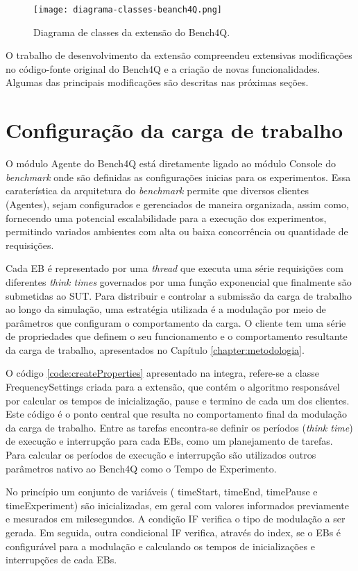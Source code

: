 \begin{figure}[!htb]
	\centering
	\texttt{[image: diagrama-classes-beanch4Q.png]}	
	\caption{Diagrama de classes da extensão do Bench4Q.}
	\label{fig:diagrama-classes}
	\fautor
\end{figure}

O trabalho de desenvolvimento da extensão compreendeu extensivas modificações no código-fonte original do Bench4Q e a criação de novas funcionalidades. Algumas das principais modificações são descritas nas próximas seções.

\section{Configuração da carga de trabalho}
O módulo Agente do Bench4Q está diretamente ligado ao módulo Console do \textit{benchmark} onde são definidas as configurações inicias para os experimentos. Essa caraterística da arquitetura do \textit{benchmark} permite que diversos clientes (Agentes), sejam configurados e gerenciados de maneira organizada, assim como, fornecendo uma potencial escalabilidade para a execução dos experimentos, permitindo variados ambientes com alta ou baixa concorrência ou quantidade de requisições.

Cada EB é representado por uma \textit{thread} que executa uma série requisições com diferentes \textit{think times} governados por uma função exponencial que finalmente são submetidas ao SUT. Para distribuir e controlar a submissão da carga de trabalho ao longo da simulação, uma estratégia utilizada é a modulação por meio de parâmetros que configuram o comportamento da carga. O cliente tem uma série de propriedades que definem o seu funcionamento e o comportamento resultante da carga de trabalho, apresentados no Capítulo \ref{chapter:metodologia}. 

O código \ref{code:createProperties} apresentado na integra, refere-se a classe \textsf{FrequencySettings} criada para a extensão, que contém o algoritmo responsável por calcular os tempos de inicialização, pause e termino de cada um dos clientes. Este código é o ponto central que resulta no comportamento final da modulação da carga de trabalho. Entre as tarefas encontra-se  definir os períodos (\textit{think time}) de execução e interrupção para cada EBs, como um planejamento de tarefas. Para calcular os períodos de execução e interrupção são utilizados outros parâmetros nativo ao Bench4Q como o Tempo de Experimento.

No princípio um conjunto de variáveis ( \textsf{timeStart}, \textsf{timeEnd}, \textsf{timePause} e \textsf{timeExperiment}) são inicializadas, em geral com valores informados previamente e mesurados em milesegundos. A condição IF verifica o tipo de modulação a ser gerada. Em seguida, outra condicional IF verifica, através do index, se o EBs é configurável para a modulação e calculando os tempos de inicializações e interrupções de cada EBs.

